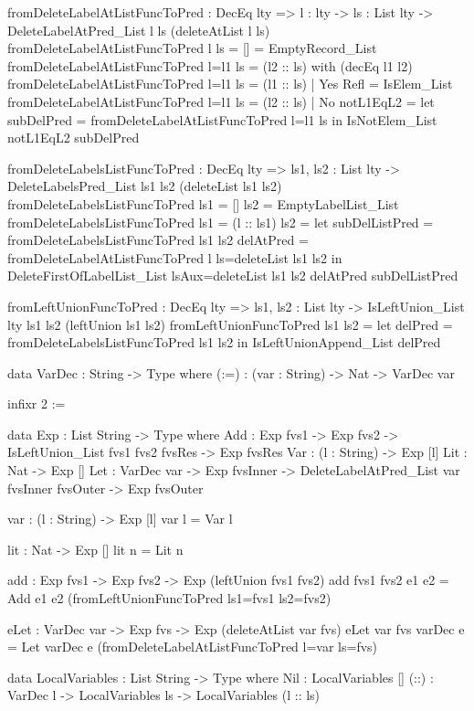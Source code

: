 \begin{code}
fromDeleteLabelAtListFuncToPred : DecEq lty => {l : lty} -> 
  {ls : List lty} -> 
  DeleteLabelAtPred_List l ls (deleteAtList l ls)
fromDeleteLabelAtListFuncToPred {l} {ls = []} = EmptyRecord_List
fromDeleteLabelAtListFuncToPred {l=l1} {ls = (l2 :: ls)} 
  with (decEq l1 l2)
  fromDeleteLabelAtListFuncToPred {l=l1} {ls = (l1 :: ls)} | 
    Yes Refl = IsElem_List
  fromDeleteLabelAtListFuncToPred {l=l1} {ls = (l2 :: ls)} | 
    No notL1EqL2 = 
    let subDelPred = fromDeleteLabelAtListFuncToPred {l=l1} {ls}
    in IsNotElem_List notL1EqL2 subDelPred  
  
fromDeleteLabelsListFuncToPred : DecEq lty => 
  {ls1, ls2 : List lty} -> 
  DeleteLabelsPred_List ls1 ls2 (deleteList ls1 ls2)
fromDeleteLabelsListFuncToPred {ls1 = []} {ls2} = 
  EmptyLabelList_List
fromDeleteLabelsListFuncToPred {ls1 = (l :: ls1)} {ls2} =
  let subDelListPred = fromDeleteLabelsListFuncToPred {ls1} {ls2}
      delAtPred = 
        fromDeleteLabelAtListFuncToPred {l} {ls=deleteList ls1 ls2}
  in DeleteFirstOfLabelList_List {lsAux=deleteList ls1 ls2} 
       delAtPred subDelListPred

fromLeftUnionFuncToPred : DecEq lty => {ls1, ls2 : List lty} -> 
  IsLeftUnion_List {lty} ls1 ls2 (leftUnion ls1 ls2)   
fromLeftUnionFuncToPred {ls1} {ls2} =
  let delPred = fromDeleteLabelsListFuncToPred {ls1} {ls2}
  in IsLeftUnionAppend_List delPred
      
data VarDec : String -> Type where
  (:=) : (var : String) -> Nat -> VarDec var

infixr 2 :=

data Exp : List String -> Type where
  Add : Exp fvs1 -> Exp fvs2 -> 
    IsLeftUnion_List fvs1 fvs2 fvsRes -> Exp fvsRes 
  Var : (l : String) -> Exp [l]
  Lit : Nat -> Exp []
  Let : VarDec var -> Exp fvsInner -> 
    DeleteLabelAtPred_List var fvsInner fvsOuter -> Exp fvsOuter
  
var : (l : String) -> Exp [l]
var l = Var l

lit : Nat -> Exp []
lit n = Lit n

add : Exp fvs1 -> Exp fvs2 -> Exp (leftUnion fvs1 fvs2)
add {fvs1} {fvs2} e1 e2 = 
  Add e1 e2 (fromLeftUnionFuncToPred {ls1=fvs1} {ls2=fvs2})

eLet : VarDec var -> Exp fvs -> Exp (deleteAtList var fvs)
eLet {var} {fvs} varDec e = 
  Let varDec e (fromDeleteLabelAtListFuncToPred {l=var} {ls=fvs})

data LocalVariables : List String -> Type where
  Nil : LocalVariables []
  (::) : VarDec l -> LocalVariables ls -> LocalVariables (l :: ls)  


\end{code}
